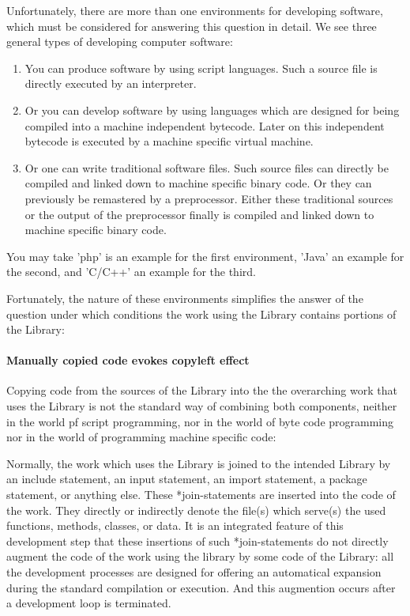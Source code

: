 Unfortunately, there are more than one environments for developing software,
which must be considered for answering this question in detail. We see three
general types of developing computer software:

\begin{enumerate}
  \item You can produce software by using script languages. Such a source file is
  directly executed by an interpreter.
  \item Or you can develop software by using
  languages which are designed for being compiled into a machine independent
  bytecode. Later on this independent bytecode is executed by a machine specific
  virtual machine.
  \item  Or one can write traditional software files. Such source files
  can directly be compiled and linked down to machine specific binary code. Or
  they can previously be remastered by a preprocessor. Either these traditional
  sources or the output of the preprocessor finally is compiled and linked down to
  machine specific binary code.
\end{enumerate}
  
You may take 'php' is an example for the first environment, 'Java' an example
for the second, and 'C/C++' an example for the third.

Fortunately, the nature of these environments simplifies the answer of the
question under which conditions the work using the Library contains portions of
the Library:

\paragraph{Manually copied code evokes copyleft effect}

Copying code from the sources of the Library into the the overarching work that
uses the Library is not the standard way of combining both components, neither
in the world pf script programming, nor in the world of byte code programming
nor in the world of programming machine specific code:

Normally, the work which uses the Library is joined to the intended Library by
an include statement, an input statement, an import statement, a package
statement, or anything else. These *join-statements are inserted into the code
of the work. They directly or indirectly denote the file(s) which serve(s) the
used functions, methods, classes, or data. It is an integrated feature of this
development step that these insertions of such *join-statements do not directly
augment the code of the work using the library by some code of the Library: all
the development processes are designed for offering an automatical expansion
during the standard compilation or execution. And this augmention occurs after a
development loop is terminated.

